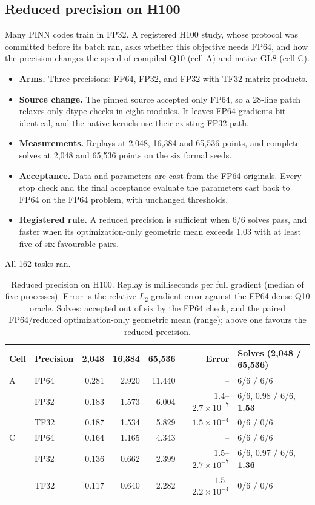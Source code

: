 \documentclass[11pt]{article}
\begin{document}
\subsection{Reduced precision on H100}\label{sec:precision}
Many PINN codes train in FP32. A registered H100 study, whose protocol was
committed before its batch ran, asks whether this objective needs FP64,
and how the precision changes the speed of compiled Q10 (cell A) and native
GL8 (cell C).
\begin{itemize}
\item \textbf{Arms.} Three precisions: FP64, FP32, and FP32 with TF32
  matrix products.
\item \textbf{Source change.} The pinned source accepted only FP64, so a
  28-line patch relaxes only dtype checks in eight modules. It leaves FP64
  gradients bit-identical, and the native kernels use their existing FP32
  path.
\item \textbf{Measurements.} Replays at 2,048, 16,384 and 65,536 points, and
  complete solves at 2,048 and 65,536 points on the six formal seeds.
\item \textbf{Acceptance.} Data and parameters are cast from the FP64
  originals. Every stop check and the final acceptance evaluate the
  parameters cast back to FP64 on the FP64 problem, with unchanged
  thresholds.
\item \textbf{Registered rule.} A reduced precision is sufficient when 6/6
  solves pass, and faster when its optimization-only geometric mean exceeds
  1.03 with at least five of six favourable pairs.
\end{itemize}
All 162 tasks ran.

\begin{table}[t]
\centering
\caption{Reduced precision on H100. Replay is milliseconds per full gradient (median of five processes). Error is the relative $L_2$ gradient error against the FP64 dense-Q10 oracle. Solves: accepted out of six by the FP64 check, and the paired FP64/reduced optimization-only geometric mean (range); above one favours the reduced precision.}
\label{tab:precision}
\small
\begin{tabular}{llrrrrl}
\toprule
Cell & Precision & 2,048 & 16,384 & 65,536 & Error & Solves (2,048 / 65,536)\\
\midrule
A & FP64 & 0.281 & 2.920 & 11.440 & -- & 6/6 / 6/6\\
 & FP32 & 0.183 & 1.573 & 6.004 & $1.4$--$2.7\times10^{-7}$ & 6/6, 0.98 / 6/6, \textbf{1.53}\\
 & TF32 & 0.187 & 1.534 & 5.829 & $1.5\times10^{-4}$ & 0/6 / 0/6\\
C & FP64 & 0.164 & 1.165 & 4.343 & -- & 6/6 / 6/6\\
 & FP32 & 0.136 & 0.662 & 2.399 & $1.5$--$2.7\times10^{-7}$ & 6/6, 0.97 / 6/6, \textbf{1.36}\\
 & TF32 & 0.117 & 0.640 & 2.282 & $1.5$--$2.2\times10^{-4}$ & 0/6 / 0/6\\
\bottomrule
\end{tabular}
\end{table}
\end{document}
